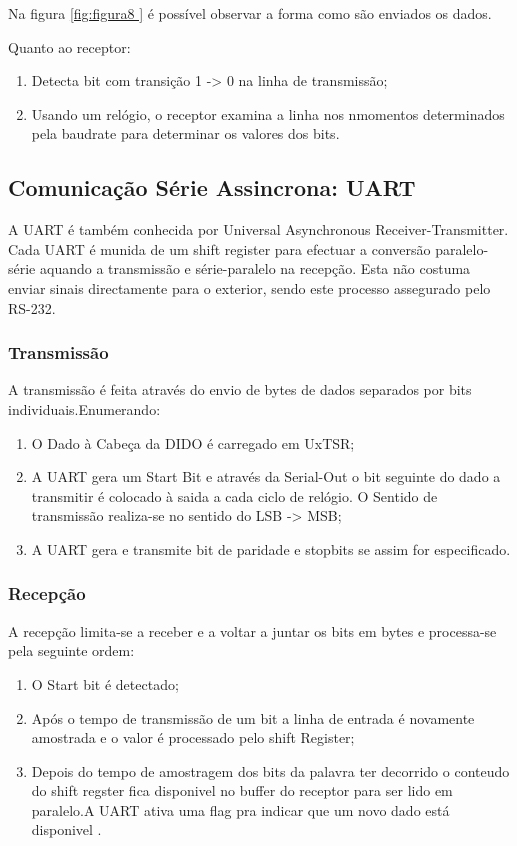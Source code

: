 \documentclass[10pt,a4paper]{paper}
\begin{document}
	Na figura \ref{fig:figura8 }  é possível observar a forma como são enviados os dados.
	
	Quanto ao receptor:
	\begin{enumerate}
		\item Detecta bit com transição 1 -> 0 na linha de transmissão;
		\item Usando um relógio, o receptor examina a linha nos nmomentos determinados pela baudrate para determinar os valores dos bits.
	\end{enumerate}
	
 \subsection{Comunicação Série Assincrona: UART}
	
	A UART é  também conhecida por Universal Asynchronous Receiver-Transmitter. 
	Cada UART é munida de um shift register para efectuar a conversão paralelo-série aquando a transmissão e série-paralelo na recepção.
	Esta não costuma enviar sinais directamente para o exterior, sendo este processo assegurado pelo RS-232.
	
\subsubsection*{Transmissão}

A transmissão é feita através do envio de bytes de dados separados por bits individuais.Enumerando:

\begin{enumerate}
	\item O Dado à Cabeça da DIDO é carregado em UxTSR;
	\item A UART gera um Start Bit e através da Serial-Out o bit seguinte do dado a transmitir é colocado à saida a cada ciclo de relógio. O Sentido de transmissão realiza-se no sentido do LSB -> MSB;
	\item A UART gera e transmite bit de paridade e stopbits se assim for especificado.
\end{enumerate}


\subsubsection*{Recepção}
	A recepção limita-se a receber e a voltar a juntar os bits em bytes e processa-se pela seguinte ordem:
	\begin{enumerate}
	\item O Start bit é detectado;
	\item Após o tempo de transmissão de um bit a linha de entrada é novamente amostrada e o valor é processado pelo shift Register;
	\item Depois do tempo de amostragem dos bits da palavra ter decorrido o conteudo do shift regster fica disponivel no buffer do receptor para ser lido em paralelo.A UART ativa uma flag pra indicar que um novo dado está disponivel .
\end{enumerate}
\end{document}
